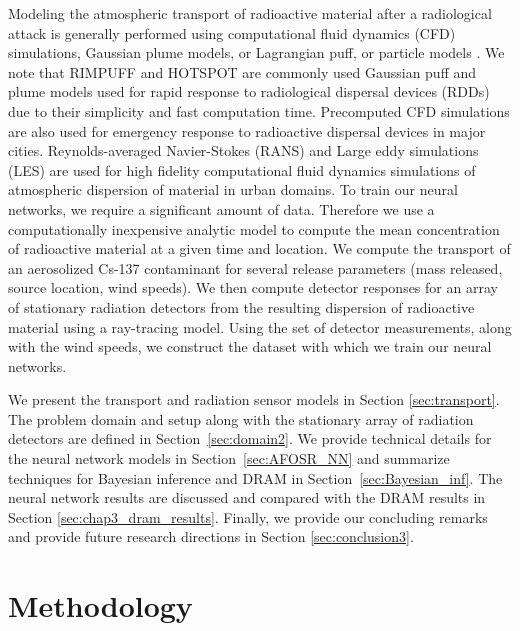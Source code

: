\documentclass[sn-mathphys-ay]{sn-jnl}
\begin{document}
Modeling the atmospheric transport of radioactive material after a radiological attack is generally performed using computational fluid dynamics (CFD) simulations, Gaussian plume models, or Lagrangian puff, or particle models \citep{Hummel}. We note that RIMPUFF \citep{Rimpuff} and HOTSPOT \citep{Hotspot} are commonly used Gaussian puff and plume models used for rapid response to radiological dispersal devices (RDDs) due to their simplicity and fast computation time. Precomputed CFD simulations are also used for emergency response to radioactive dispersal devices in major cities. Reynolds-averaged Navier-Stokes (RANS) and Large eddy simulations (LES) are used for high fidelity computational fluid dynamics simulations of atmospheric dispersion of material in urban domains. To train our neural networks, we require a significant amount of data. Therefore we use a computationally inexpensive analytic model to compute the mean concentration of radioactive material at a given time and location. We compute the transport of an aerosolized Cs-137 contaminant for several release parameters (mass released, source location, wind speeds). We then compute detector responses for an array of stationary radiation detectors from the resulting dispersion of radioactive material using a ray-tracing model. Using the set of detector measurements, along with the wind speeds, we construct the dataset with which we train our neural networks.

We present the transport and radiation sensor models in Section \ref{sec:transport}. The problem domain and setup along with the stationary array of radiation detectors are defined in Section~\ref{sec:domain2}. We provide technical details for the neural network models in Section~\ref{sec:AFOSR_NN} and summarize techniques for Bayesian inference and DRAM in Section~\ref{sec:Bayesian_inf}. The neural network results are discussed and compared with the DRAM results in Section \ref{sec:chap3_dram_results}. Finally, we provide our concluding remarks and provide future research directions in Section \ref{sec:conclusion3}.   

\section{Methodology}
\end{document}
